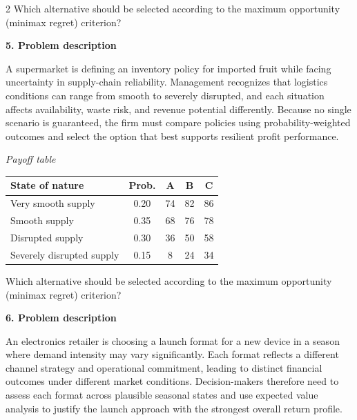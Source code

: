 \documentclass[12pt]{article}
\newcommand{\SubsectionBox}[1]{%
	\noindent\colorbox{gray!30}{%
		\parbox{\linewidth}{\textbf{#1}}%
	}\par\vspace{0.35cm}%
}
\begin{document}
\begin{multicols}{2}
				Which alternative should be selected according to the maximum opportunity (minimax regret) criterion?

		\vspace{0.25cm}
		\SubsectionBox{5. Problem description}\vspace{-0.25cm}
		A supermarket is defining an inventory policy for imported fruit while facing uncertainty in supply-chain reliability. Management recognizes that logistics conditions can range from smooth to severely disrupted, and each situation affects availability, waste risk, and revenue potential differently. Because no single scenario is guaranteed, the firm must compare policies using probability-weighted outcomes and select the option that best supports resilient profit performance.
		
				\begin{center}
					\textit{Payoff table} \par
					\begin{tabular}{l c c c c}
						\toprule
						State of nature & Prob. &  A & B & C \\
						\midrule
						Very smooth supply & 0.20 & 74 & 82 & 86 \\
						Smooth supply & 0.35 & 68 & 76 & 78 \\
						Disrupted supply & 0.30 & 36 & 50 & 58 \\
						Severely disrupted supply & 0.15 & 8 & 24 & 34 \\
						\bottomrule
					\end{tabular}
				\end{center}
		
				Which alternative should be selected according to the maximum opportunity (minimax regret) criterion?

		\vspace{0.25cm}
		\SubsectionBox{6. Problem description}\vspace{-0.25cm}
		An electronics retailer is choosing a launch format for a new device in a season where demand intensity may vary significantly. Each format reflects a different channel strategy and operational commitment, leading to distinct financial outcomes under different market conditions. Decision-makers therefore need to assess each format across plausible seasonal states and use expected value analysis to justify the launch approach with the strongest overall return profile.
		

\end{multicols}
\end{document}

